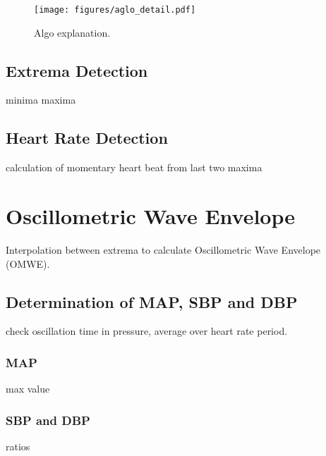 \begin{figure}[ht]
\centering
\texttt{[image: figures/aglo\_detail.pdf]}
\caption{Algo explanation.}
\label{fig:algoDetail}
\end{figure}
\subsection{Extrema Detection}
minima
maxima

\subsection{Heart Rate Detection}
calculation of momentary heart beat from last two maxima



\section{Oscillometric Wave Envelope}
Interpolation between extrema to calculate Oscillometric Wave Envelope (OMWE).

\subsection{Determination of MAP, SBP and DBP}
check oscillation time in pressure, average over heart rate period.
\subsubsection{MAP}
max value
\subsubsection{SBP and DBP}
ratios
